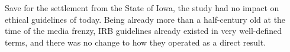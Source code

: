 \documentclass[american]{../../../coursework}
\begin{document}
Save for the settlement from the State of Iowa, the study had no impact
on ethical guidelines of today. Being already more than a half-century
old at the time of the media frenzy, IRB guidelines already existed in
very well-defined terms, and there was no change to how they operated as
a direct result.

\printbibliography
\end{document}

